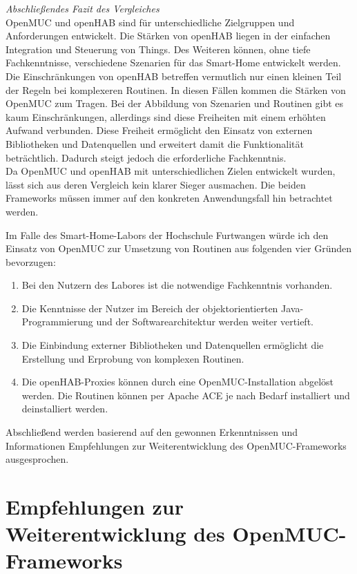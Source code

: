 \textit{Abschließendes Fazit des Vergleiches}\\
OpenMUC und openHAB sind für unterschiedliche Zielgruppen und Anforderungen entwickelt.
Die Stärken von openHAB liegen in der einfachen Integration und Steuerung von Things.
Des Weiteren können, ohne tiefe Fachkenntnisse, verschiedene Szenarien für das Smart-Home entwickelt werden.
Die Einschränkungen von openHAB betreffen vermutlich nur einen kleinen Teil der Regeln bei komplexeren Routinen.
In diesen Fällen kommen die Stärken von OpenMUC zum Tragen. 
Bei der Abbildung von Szenarien und Routinen gibt es kaum Einschränkungen, allerdings sind diese Freiheiten mit einem erhöhten Aufwand verbunden.
Diese Freiheit ermöglicht den Einsatz von externen Bibliotheken und Datenquellen und erweitert damit die Funktionalität beträchtlich.
Dadurch steigt jedoch die erforderliche Fachkenntnis.\\
Da OpenMUC und openHAB mit unterschiedlichen Zielen entwickelt wurden, lässt sich aus deren Vergleich kein klarer Sieger ausmachen.
Die beiden Frameworks müssen immer auf den konkreten Anwendungsfall hin betrachtet werden.

Im Falle des Smart-Home-Labors der Hochschule Furtwangen würde ich den Einsatz von OpenMUC zur Umsetzung von Routinen aus folgenden vier Gründen bevorzugen:
\begin{enumerate}
 \item Bei den Nutzern des Labores ist die notwendige Fachkenntnis vorhanden.
 \item Die Kenntnisse der Nutzer im Bereich der objektorientierten Java-Programmie\-rung und der Softwarearchitektur werden weiter vertieft.
 \item Die Einbindung externer Bibliotheken und Datenquellen ermöglicht die Erstellung und Erprobung von komplexen Routinen.
 \item Die openHAB-Proxies können durch eine OpenMUC-Installation abgelöst werden. Die Routinen können per Apache ACE je nach Bedarf installiert und deinstalliert werden. 
\end{enumerate}

Abschließend werden basierend auf den gewonnen Erkenntnissen und Informationen Empfehlungen zur Weiterentwicklung des OpenMUC-Frameworks ausgesprochen.

\section{Empfehlungen zur Weiterentwicklung des OpenMUC-Frameworks}
\label{sec:recommendations}

